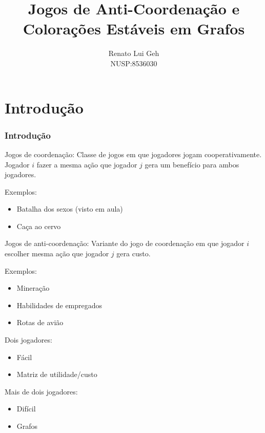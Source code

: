 \documentclass{beamer}
\title{Jogos de Anti-Coordenação e Colorações Estáveis em Grafos}
\author{Renato Lui Geh\\NUSP:8536030}
\date{}
\theoremstyle{plain}
\begin{document}
\frame{\titlepage}

\section{Introdução}
\begin{frame}
  \frametitle{Introdução}

  \begin{block}{Jogos de coordenação:}
    Classe de jogos em que jogadores jogam cooperativamente. Jogador $i$ fazer a mesma ação que
    jogador $j$ gera um benefício para ambos jogadores.
  \end{block}

  \begin{block}{Exemplos:}
    \begin{itemize}
      \item Batalha dos sexos (visto em aula)
      \item Caça ao cervo
    \end{itemize}
  \end{block}
\end{frame}

\begin{frame}
  \begin{block}{Jogos de anti-coordenação:}
    Variante do jogo de coordenação em que jogador $i$ escolher mesma ação que jogador $j$ gera
    custo.
  \end{block}

  \begin{block}{Exemplos:}
    \begin{itemize}
      \item Mineração
      \item Habilidades de empregados
      \item Rotas de avião
    \end{itemize}
  \end{block}
\end{frame}

\begin{frame}
  \begin{block}{Dois jogadores:}
    \begin{itemize}
      \item Fácil
      \item Matriz de utilidade/custo
    \end{itemize}
  \end{block}

  \begin{block}{Mais de dois jogadores:}
    \begin{itemize}
      \item Difícil
      \item Grafos
    \end{itemize}
  \end{block}
\end{frame}
\end{document}
